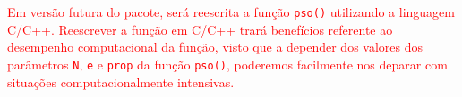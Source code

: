 \documentclass[10pt,letterpaper]{article}
\begin{document}
\textcolor{red}{Em versão futura do pacote, será reescrita a função \texttt{pso()} utilizando a linguagem C/C++. Reescrever a função em C/C++ trará benefícios referente ao desempenho computacional da função, visto que a depender dos valores dos parâmetros \texttt{N}, \texttt{e} e \texttt{prop} da função \texttt{pso()}, poderemos facilmente nos deparar com situações computacionalmente intensivas.}






\end{document}
